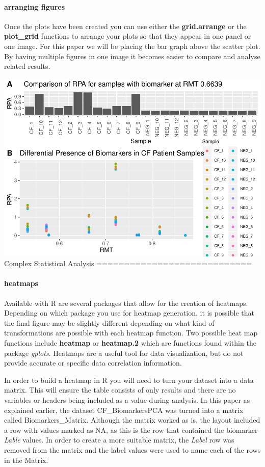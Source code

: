 \documentclass[]{elsarticle} %
\makeatletter
\def\maxwidth{\ifdim\Gin@nat@width>\linewidth\linewidth
\else\Gin@nat@width\fi}
\let\Oldincludegraphics\includegraphics
\renewcommand{\includegraphics}[1]{\Oldincludegraphics[width=\maxwidth]{#1}}
\makeatother
\begin{document}
\hypertarget{arranging-figures}{%
\paragraph{arranging figures}\label{arranging-figures}}

Once the plots have been created you can use either the
\textbf{grid.arrange} or the \textbf{plot\_grid} functions to arrange
your plots so that they appear in one panel or one image. For this paper
we will be placing the bar graph above the scatter plot. By having
multiple figures in one image it becomes easier to compare and analyse
related results.

\includegraphics{06DecFinalDeliverableArticle_files/figure-latex/arranginf plots into figure-1.pdf}
Complex Statistical Analysis ============================

\hypertarget{heatmaps}{%
\paragraph{heatmaps}\label{heatmaps}}

Available with R are several packages that allow for the creation of
heatmaps. Depending on which package you use for heatmap generation, it
is possible that the final figure may be slightly different depending on
what kind of transformations are possible with each heatmap function.
Two possible heat map functions include \textbf{heatmap} or
\textbf{heatmap.2} which are functions found within the package
\emph{gplots}. Heatmaps are a useful tool for data visualization, but do
not provide accurate or specific data correlation information.

In order to build a heatmap in R you will need to turn your dataset into
a data matrix. This will ensure the table consists of only results and
there are no variables or headers being included as a value during
analysis. In this paper as explained earlier, the dataset
CF\_BiomarkersPCA was turned into a matrix called Biomarkers\_Matrix.
Although the matrix worked as is, the layout included a row with values
marked as NA, as this is the row that contained the biomarker
\emph{Lable} values. In order to create a more suitable matrix, the
\emph{Label} row was removed from the matrix and the label values were
used to name each of the rows in the Matrix.
\end{document}
